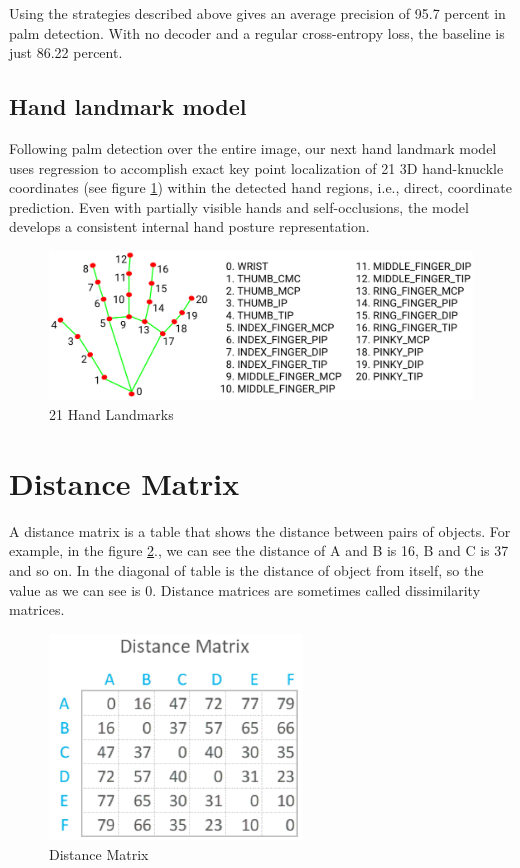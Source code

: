 Using the strategies described above gives an average precision of 95.7 percent in palm detection. With no decoder and a regular cross-entropy loss, the baseline is just 86.22 percent.

\subsection{ Hand landmark model }
Following palm detection over the entire image, our next hand landmark model uses regression to accomplish exact key point localization of 21 3D hand-knuckle coordinates (see figure \ref{fig:Chap3-HandLandMark}) within the detected hand regions, i.e., direct, coordinate prediction. Even with partially visible hands and self-occlusions, the model develops a consistent internal hand posture representation.
\begin{figure}[H]
	\centering
	\includegraphics[width=\textwidth]{img/Chap3/HandLandMark}
	\caption{ 21 Hand Landmarks }
	\label{fig:Chap3-HandLandMark}
\end{figure}


\section{ Distance Matrix }
A distance matrix is a table that shows the distance between pairs of objects.
For example, in the figure \ref{fig:Chap3-DM}., we can see the distance of A and B is 16, B and C is 37
and so on. In the diagonal of table is the distance of object from itself, so the value
as we can see is 0. Distance matrices are sometimes called dissimilarity matrices.

\begin{figure}[H]
	\centering
	\includegraphics[width=0.6\textwidth]{img/Chap3/DM}
	\caption{ Distance Matrix }
	\label{fig:Chap3-DM}
\end{figure}

